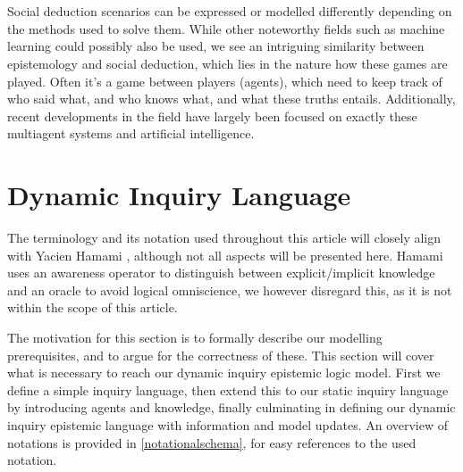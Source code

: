 \\\\

Social deduction scenarios can be expressed or modelled differently depending
on the methods used to solve them. While other noteworthy fields such as
machine learning could possibly also be used, we see an intriguing similarity
between epistemology and social deduction, which lies in the nature how these
games are played. Often it's a game between players (agents), which need to keep
track of who said what, and who knows what, and what these truths entails.
Additionally, recent developments in the field have largely been focused on
exactly these multiagent systems and artificial intelligence.

\section{Dynamic Inquiry Language}
The terminology and its notation used throughout this article will closely
align with Yacien Hamami \cite{delimi}, although not all aspects will be
presented here. Hamami uses an awareness operator to distinguish between
explicit/implicit knowledge and an oracle to avoid logical omniscience, we
however disregard this, as it is not within the scope of this article.

The motivation for this section is to formally describe our modelling
prerequisites, and to argue for the correctness of these. This section will
cover what is necessary to reach our dynamic inquiry epistemic logic model.
First we define a simple inquiry language, then extend this to our static
inquiry language by introducing agents and knowledge, finally culminating in
defining our dynamic inquiry epistemic language with information and model
updates. An overview of notations is provided in \cref{notationalschema}, for
easy references to the used notation.

\newpage

